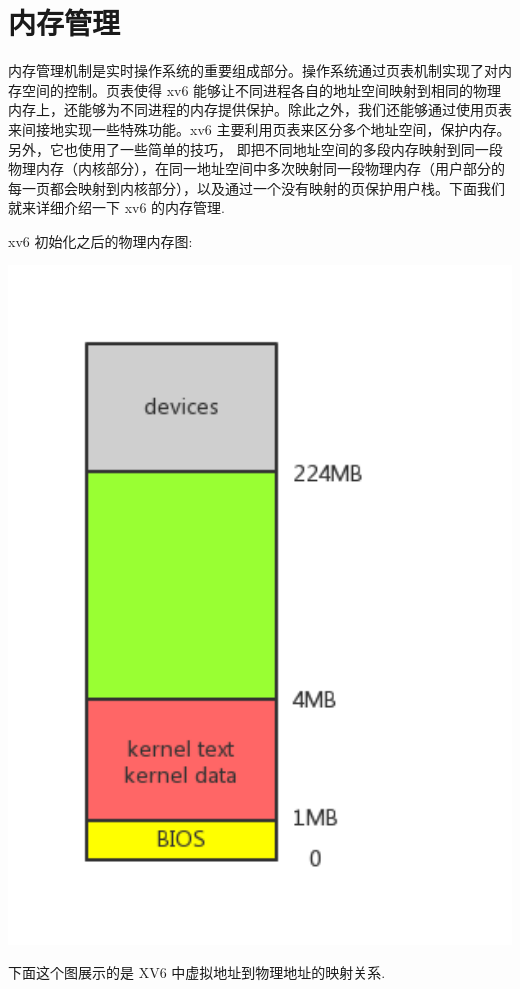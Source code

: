 \section{内存管理}

内存管理机制是实时操作系统的重要组成部分。操作系统通过页表机制实现了对内存空间的控制。页表使得 xv6 能够让不同进程各自的地址空间映射到相同的物理内存上，还能够为不同进程的内存提供保护。除此之外，我们还能够通过使用页表来间接地实现一些特殊功能。xv6 主要利用页表来区分多个地址空间，保护内存。另外，它也使用了一些简单的技巧， 即把不同地址空间的多段内存映射到同一段物理内存（内核部分），在同一地址空间中多次映射同一段物理内存（用户部分的每一页都会映射到内核部分），以及通过一个没有映射的页保护用户栈。下面我们就来详细介绍一下 xv6 的内存管理.

xv6 初始化之后的物理内存图:

\includegraphics[width=6in]{figures/mem/fig1.png}

下面这个图展示的是 XV6 中虚拟地址到物理地址的映射关系.

